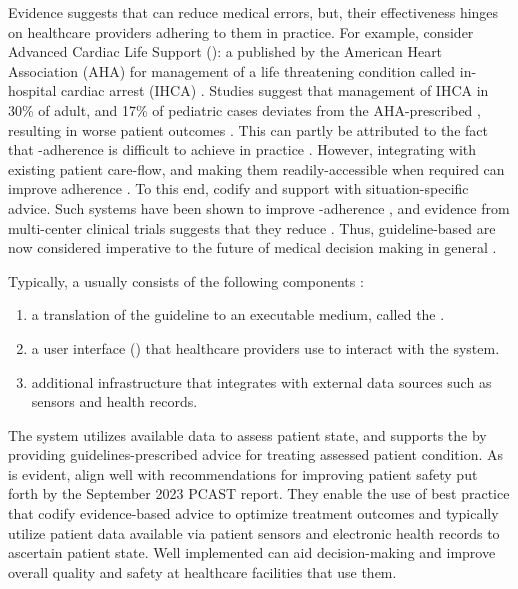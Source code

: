 Evidence suggests that \BPGs{} can reduce medical errors, but,
their effectiveness hinges on healthcare providers adhering to them in practice.
For example, consider Advanced Cardiac Life Support (\ACLS{}): a \BPG{} published
by the American Heart Association (AHA) for management
of a life threatening condition called in-hospital cardiac arrest (IHCA) \cite{AHAGuidelineAdult, AHAGuidelinePed}. Studies suggest that management
of IHCA in 30\% of adult, and 17\% of pediatric cases deviates from the
AHA-prescribed \BPG, resulting in worse patient outcomes \cite{Ornato2012DeviationAdult,Wolfe2020DeviationPediatric,
Crowley2020DeviationAdult,Honarmand2018Adherence,Mcevoy2014Adherence}.
This can partly be attributed to the fact
that \BPG{}-adherence is difficult to achieve in
practice \cite{RandJAMA99,DavisCMAJ97}. However,
integrating \BPGs{} with existing patient care-flow,
and making them readily-accessible when required can improve adherence \cite{WoolfBMJ99}.
To this end, \CDSSs{}
codify \BPGs{} and support \HCPs{} with situation-specific advice.
Such systems have been shown to improve \BPG{}-adherence \cite{GargJAMA06,KawamotoBMJ05}, and evidence from multi-center clinical trials
suggests that they reduce \PMEs{} \cite{BenettJAMIA16,SahotaJIS11}.
Thus, guideline-based \CDSSs{} are now considered imperative to the
future of medical decision making in general \cite{JamesNEJM01}.

Typically, a \CDSS{} usually consists of the following components \cite{SuttonNature20}:
\begin{enumerate}[label=(\alph*)]
  \item a translation of the guideline to an executable medium, called the
  \BPGLogic{}.
\item a user interface (\UI{}) that healthcare providers use to interact with
  the system.
  \item additional infrastructure that integrates with external data sources
  such as sensors and health records.
\end{enumerate}
The system utilizes available data to assess patient state, and
supports the \HCP{} by providing guidelines-prescribed advice for treating
assessed patient condition. As is evident, \CDSSs{} align well with
recommendations for improving patient safety put forth by the September 2023
PCAST report. They enable the use of best practice that codify evidence-based
advice to optimize treatment outcomes and typically utilize patient data
available via patient sensors and electronic health records to ascertain patient
state. Well implemented \CDSSs{} can aid decision-making and improve overall
quality and safety at healthcare facilities that use them.

